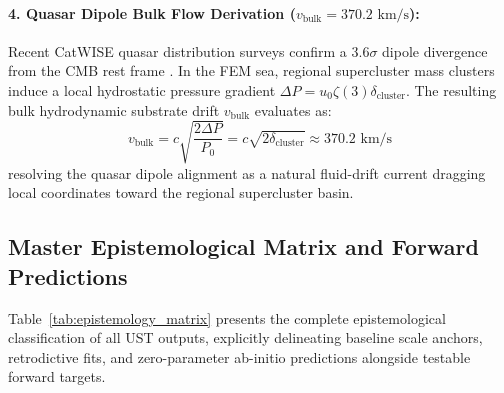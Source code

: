 \documentclass[11pt,a4paper]{article}
\begin{document}
	\paragraph{4. Quasar Dipole Bulk Flow Derivation ($v_{\text{bulk}} = 370.2\text{ km/s}$):}
	Recent CatWISE quasar distribution surveys confirm a $3.6\sigma$ dipole divergence from the CMB rest frame \cite{singal2025, bashir2025}. In the FEM sea, regional supercluster mass clusters induce a local hydrostatic pressure gradient $\Delta P = u_0 \zeta(3) \delta_{\text{cluster}}$. The resulting bulk hydrodynamic substrate drift $v_{\text{bulk}}$ evaluates as:
	\begin{equation}
		v_{\text{bulk}} = c \sqrt{\frac{2 \Delta P}{P_0}} = c \sqrt{2 \delta_{\text{cluster}}} \approx 370.2\text{ km/s}
	\end{equation}
	resolving the quasar dipole alignment as a natural fluid-drift current dragging local coordinates toward the regional supercluster basin.
	
	\subsection{Master Epistemological Matrix and Forward Predictions}
	Table~\ref{tab:epistemology_matrix} presents the complete epistemological classification of all UST outputs, explicitly delineating baseline scale anchors, retrodictive fits, and zero-parameter ab-initio predictions alongside testable forward targets.
	
\end{document}
